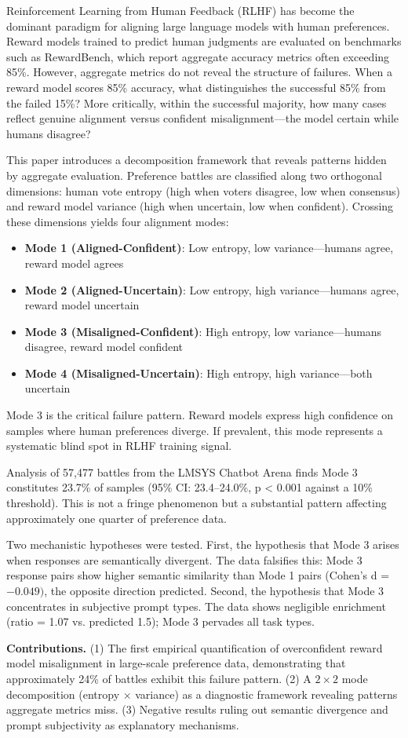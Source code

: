 
Reinforcement Learning from Human Feedback (RLHF) has become the dominant paradigm for aligning large language models with human preferences. Reward models trained to predict human judgments are evaluated on benchmarks such as RewardBench, which report aggregate accuracy metrics often exceeding 85\%. However, aggregate metrics do not reveal the structure of failures. When a reward model scores 85\% accuracy, what distinguishes the successful 85\% from the failed 15\%? More critically, within the successful majority, how many cases reflect genuine alignment versus confident misalignment---the model certain while humans disagree?

This paper introduces a decomposition framework that reveals patterns hidden by aggregate evaluation. Preference battles are classified along two orthogonal dimensions: human vote entropy (high when voters disagree, low when consensus) and reward model variance (high when uncertain, low when confident). Crossing these dimensions yields four alignment modes:

\begin{itemize}
\item \textbf{Mode 1 (Aligned-Confident)}: Low entropy, low variance---humans agree, reward model agrees
\item \textbf{Mode 2 (Aligned-Uncertain)}: Low entropy, high variance---humans agree, reward model uncertain
\item \textbf{Mode 3 (Misaligned-Confident)}: High entropy, low variance---humans disagree, reward model confident
\item \textbf{Mode 4 (Misaligned-Uncertain)}: High entropy, high variance---both uncertain
\end{itemize}

Mode 3 is the critical failure pattern. Reward models express high confidence on samples where human preferences diverge. If prevalent, this mode represents a systematic blind spot in RLHF training signal.

Analysis of 57,477 battles from the LMSYS Chatbot Arena finds Mode 3 constitutes 23.7\% of samples (95\% CI: 23.4--24.0\%, p < 0.001 against a 10\% threshold). This is not a fringe phenomenon but a substantial pattern affecting approximately one quarter of preference data.

Two mechanistic hypotheses were tested. First, the hypothesis that Mode 3 arises when responses are semantically divergent. The data falsifies this: Mode 3 response pairs show higher semantic similarity than Mode 1 pairs (Cohen's d = $-0.049)$, the opposite direction predicted. Second, the hypothesis that Mode 3 concentrates in subjective prompt types. The data shows negligible enrichment (ratio = 1.07 vs. predicted 1.5); Mode 3 pervades all task types.

\textbf{Contributions.} (1) The first empirical quantification of overconfident reward model misalignment in large-scale preference data, demonstrating that approximately 24\% of battles exhibit this failure pattern. (2) A $2\times 2$ mode decomposition (entropy $\times$ variance) as a diagnostic framework revealing patterns aggregate metrics miss. (3) Negative results ruling out semantic divergence and prompt subjectivity as explanatory mechanisms.
